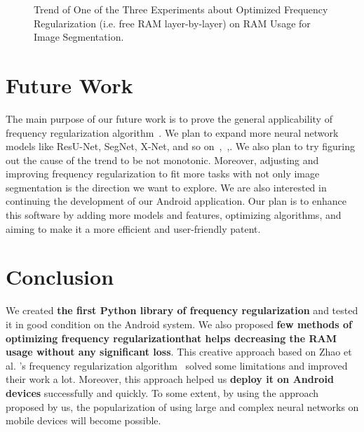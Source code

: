 \documentclass[runningheads]{llncs}
\begin{document}
\begin{figure}[h]
	\centering
	\caption{Trend of One of the Three Experiments about Optimized Frequency Regularization (i.e. free RAM layer-by-layer) on RAM Usage for Image Segmentation.}
	\label{plot:optimized}
\end{figure}


\section{Future Work}
The main purpose of our future work is to prove the general applicability of frequency regularization algorithm~\cite{zhao2023fr}. We plan to expand more neural network models like ResU-Net, SegNet, X-Net, and so on~\cite{foivos2020resunet},~\cite{vijay2017segnet},\cite{fujii2021xnet}. We also plan to try figuring out the cause of the trend to be not monotonic. Moreover, adjusting and improving frequency regularization to fit more tasks with not only image segmentation is the direction we want to explore. We are also interested in continuing the development of our Android application. Our plan is to enhance this software by adding more models and features, optimizing algorithms, and aiming to make it a more efficient and user-friendly patent.


\section{Conclusion} 
We created \textbf{the first Python library of frequency regularization} and tested it in good condition on the Android system. We also proposed \textbf{few methods of optimizing frequency regularization}\textbf{that helps decreasing the RAM usage without any significant loss}. This creative approach based on Zhao et al. 's frequency regularization algorithm~\cite{zhao2023fr} solved some limitations and improved their work a lot. Moreover, this approach helped us \textbf{deploy it on Android devices} successfully and quickly. To some extent, by using the approach proposed by us, the popularization of using large and complex neural networks on mobile devices will become possible.

\newpage


\end{document}
